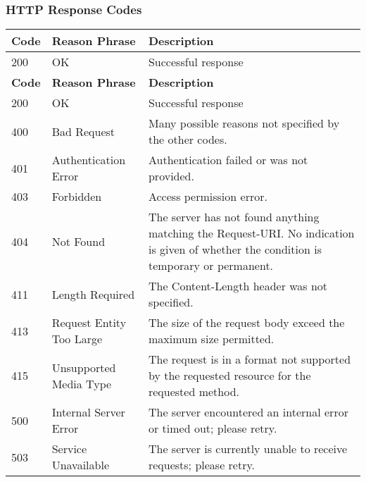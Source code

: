 
\subsubsection{HTTP Response Codes}

\begin{comment}
List expected response codes (indicate any variation that exists across
different versions):
\end{comment}


\begin{longtable}{|>{\raggedright}p{}|>{\raggedright}p{}|>{\raggedright}p{}|}
\hline
\hline 
\textbf{\footnotesize{Code}} & \textbf{\footnotesize{Reason Phrase}} & \textbf{\footnotesize{Description}}\tabularnewline
\hline 
{\footnotesize{200}} & {\footnotesize{OK}} & {\footnotesize{Successful response}}\tabularnewline
\hline
\endfirsthead
\hline
\hline 
\textbf{\footnotesize{Code}} & \textbf{\footnotesize{Reason Phrase}} & \textbf{\footnotesize{Description}}\tabularnewline
\hline 
{\footnotesize{200}} & {\footnotesize{OK}} & {\footnotesize{Successful response}}\tabularnewline
\hline
\endhead
\hline 
{\footnotesize{400}} & {\footnotesize{Bad Request}} & {\footnotesize{Many possible reasons not specified by the other codes.}}\tabularnewline
\hline 
{\footnotesize{401}} & {\footnotesize{Authentication Error}} & {\footnotesize{Authentication failed or was not provided.}}\tabularnewline
\hline 
{\footnotesize{403}} & {\footnotesize{Forbidden}} & {\footnotesize{Access permission error.}}\tabularnewline
\hline 
{\footnotesize{404}} & {\footnotesize{Not Found}} & {\footnotesize{The server has not found anything matching the Request-URI.
No indication is given of whether the condition is temporary or permanent.}}\tabularnewline
\hline 
{\footnotesize{411}} & {\footnotesize{Length Required}} & {\footnotesize{The Content-Length header was not specified.}}\tabularnewline
\hline 
{\footnotesize{413}} & {\footnotesize{Request Entity Too Large}} & {\footnotesize{The size of the request body exceed the maximum size
permitted.}}\tabularnewline
\hline 
{\footnotesize{415}} & {\footnotesize{Unsupported Media Type}} & {\footnotesize{The request is in a format not supported by the requested
resource for the requested method.}}\tabularnewline
\hline 
{\footnotesize{500}} & {\footnotesize{Internal Server Error}} & {\footnotesize{The server encountered an internal error or timed out;
please retry.}}\tabularnewline
\hline 
{\footnotesize{503}} & {\footnotesize{Service Unavailable}} & {\footnotesize{The server is currently unable to receive requests;
please retry.}}\tabularnewline
\hline 
\end{longtable}




